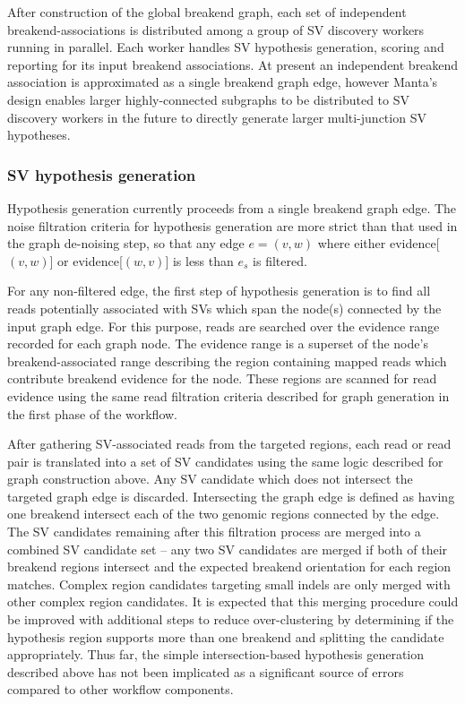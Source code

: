 \documentclass{article}
\begin{document}
After construction of the global breakend graph, each set of independent breakend-associations is distributed among a group of SV discovery workers running in parallel. Each worker handles SV hypothesis generation, scoring and reporting for its input breakend associations. At present an independent breakend association is approximated as a single breakend graph edge, however Manta's design enables larger highly-connected subgraphs to be distributed to SV discovery workers in the future to directly generate larger multi-junction SV hypotheses.

\subsubsection{SV hypothesis generation}

Hypothesis generation currently proceeds from a single breakend graph edge. The noise filtration criteria for hypothesis generation are more strict than that used in the graph de-noising step, so that any edge $e = (v,w)$ where either evidence[$(v,w)$] or evidence[$(w,v)$] is less than $e_s$ is filtered.

For any non-filtered edge, the first step of hypothesis generation is to find all reads potentially associated with SVs which span the node(s) connected by the input graph edge. For this purpose, reads are searched over the evidence range recorded for each graph node. The evidence range is a superset of the node's breakend-associated range describing the region containing mapped reads which contribute breakend evidence for the node. These regions are scanned for read evidence using the same read filtration criteria described for graph generation in the first phase of the workflow.

After gathering SV-associated reads from the targeted regions, each read or read pair is translated into a set of SV candidates using the same logic described for graph construction above. Any SV candidate which does not intersect the targeted graph edge is discarded. Intersecting the graph edge is defined as having one breakend intersect each of the two genomic regions connected by the edge. The SV candidates remaining after this filtration process are merged into a combined SV candidate set -- any two SV candidates are merged if both of their breakend regions intersect and the expected breakend orientation for each region matches. Complex region candidates targeting small indels are only merged with other complex region candidates. It is expected that this merging procedure could be improved with additional steps to reduce over-clustering by determining if the hypothesis region supports more than one breakend and splitting the candidate appropriately. Thus far, the simple intersection-based hypothesis generation described above has not been implicated as a significant source of errors compared to other workflow components.
\end{document}
